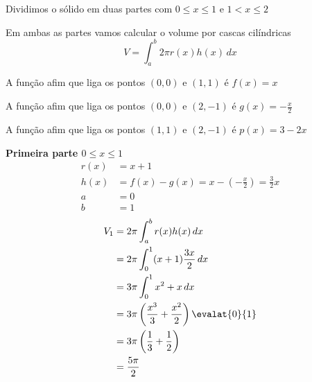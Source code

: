 \documentclass[a4paper,12pt,fleqn]{article}
\begin{document}
\begin{answer}
  Dividimos o sólido em duas partes com $0\leq x\leq 1$ e $1<x\leq 2$

  Em ambas as partes vamos calcular o volume por cascas cilíndricas
  \[
    V = \int_a^b 2\pi r(x) h(x) \, dx
  \]

  A função afim que liga os pontos $(0, 0)$ e $(1,  1)$ é $f(x)=x$

  A função afim que liga os pontos $(0, 0)$ e $(2, -1)$ é $g(x)=-\frac{x}{2}$

  A função afim que liga os pontos $(1, 1)$ e $(2, -1)$ é $p(x)=3-2x$

  \textbf{Primeira parte $0\leq x\leq 1$ }
  \begin{align*}
    r(x) & = x + 1                                                     \\
    h(x) & = f(x) - g(x) = x -\left(-\frac{x}{2}\right) = \frac{3}{2}x \\
    a    & = 0                                                         \\
    b    & = 1
  \end{align*}
  \vspace{-2\baselineskip}
  \begin{align*}
    V_1 & = 2\pi \int_a^b r(x) h(x) \, dx                               \\
        & = 2\pi \int_0^1 (x+1) \frac{3x}{2} \, dx                      \\
        & = 3\pi\int_0^1 x^2+x \, dx                                    \\
        & = 3\pi\left(\frac{x^3}{3} + \frac{x^2}{2}\right)\evalat{0}{1} \\
        & = 3\pi \left( \frac{1}{3} + \frac{1}{2}\right)                \\
        & = \frac{5\pi}{2}
  \end{align*}


\end{answer}
\end{document}
